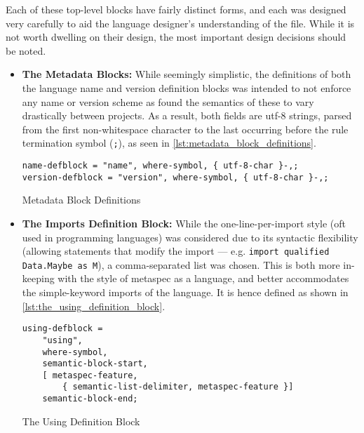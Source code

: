 Each of these top-level blocks have fairly distinct forms, and each was designed very carefully to aid the language designer's understanding of the file.
While it is not worth dwelling on their design, the most important design decisions should be noted.
\begin{itemize}
    \item \textbf{The Metadata Blocks:} While seemingly simplistic, the definitions of both the language name and version definition blocks was intended to not enforce any name or version scheme as \citet{raemaekers2014semantic} found the semantics of these to vary drastically between projects.
    As a result, both fields are utf-8 strings, parsed from the first non-whitespace character to the last occurring before the rule termination symbol (\texttt{;}), as seen in \autoref{lst:metadata_block_definitions}.
\begin{listing}[!htb]
\begin{verbatim}
name-defblock = "name", where-symbol, { utf-8-char }-,;
version-defblock = "version", where-symbol, { utf-8-char }-,;
\end{verbatim}
\caption{Metadata Block Definitions}
\label{lst:metadata_block_definitions}
\end{listing}

    \item \textbf{The Imports Definition Block:} While the one-line-per-import style (oft used in programming languages) was considered due to its syntactic flexibility (allowing statements that modify the import --- e.g. \texttt{import qualified Data.Maybe as M}), a comma-separated list was chosen. 
    This is both more in-keeping with the style of metaspec as a language, and better accommodates the simple-keyword imports of the language. 
    It is hence defined as shown in \autoref{lst:the_using_definition_block}. 
\begin{listing}[!htb]
\begin{verbatim}
using-defblock =
    "using",
    where-symbol,
    semantic-block-start,
    [ metaspec-feature, 
        { semantic-list-delimiter, metaspec-feature }]
    semantic-block-end; 
\end{verbatim}
\caption{The Using Definition Block}
\label{lst:the_using_definition_block}
\end{listing}


\end{itemize}
